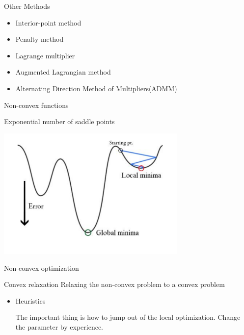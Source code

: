     \begin{frame}{Other Methods}
      \Large
      \begin{spacing}{1.5}
        \begin{itemize}
          \item Interior-point method
          \item Penalty method
          \item Lagrange multiplier
          \item Augmented Lagrangian method
          \item Alternating Direction Method of Multipliers(ADMM)
        \end{itemize}
      \end{spacing}
    \end{frame}

    \begin{frame}{Non-convex functions}
      \begin{block}
        {Exponential number of saddle points}
      \end{block}
      \centering
      \includegraphics[width = 0.7\textwidth]{images/Non-convex1.png}
    \end{frame}

    \begin{frame}{Non-convex optimization}
      \begin{block}{Convex relaxation}
        Relaxing the non-convex problem to a convex problem

      \end{block}
      \begin{itemize}

      \item<-> Heuristics

      The important thing is how to jump out of the local optimization.
      Change the parameter by experience.
      \end{itemize}
    \end{frame}

